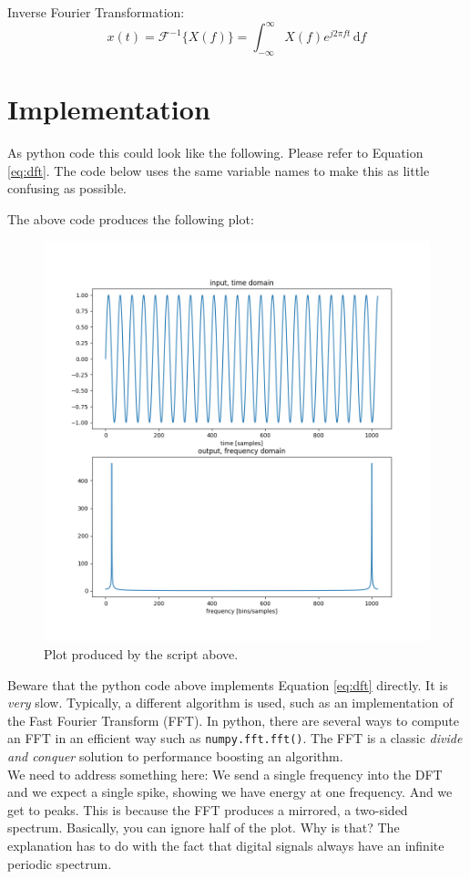 Inverse Fourier Transformation:\\
\begin{equation}
	x(t)= \mathcal{F}^{-1} \{X(f)\} = \int_{-\infty}^\infty \! X(f) e^{j2\pi ft} \, \mathrm{d}f
\end{equation}

\section{Implementation}


As python code this could look like the following. Please refer to Equation \ref{eq:dft}. The code below uses the same variable names to make this as little confusing as possible.
\newpage

The above code produces the following plot:
\begin{figure}[H]
	\centering
	\includegraphics[width=\textwidth]{img/pythonDFT.png}
	\caption[DFT Plot]
	{Plot produced by the script above.}
	\label{fig:label}
\end{figure}

Beware that the python code above implements Equation \ref{eq:dft} directly. It is \textit{very} slow. Typically, a different algorithm is used, such as an implementation of the Fast Fourier Transform (FFT). In python, there are several ways to compute an FFT in an efficient way such as \texttt{numpy.fft.fft()}. The FFT is a classic \textit{divide and conquer} solution to performance boosting an algorithm.\\
We need to address something here: We send a single frequency into the DFT and we expect a single spike, showing we have energy at one frequency. And we get to peaks. This is because the FFT produces a mirrored, a two-sided spectrum. Basically, you can ignore half of the plot. Why is that? The explanation has to do with the fact that digital signals always have an infinite periodic spectrum.



